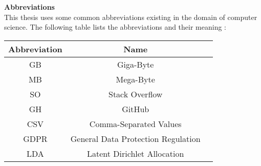 \begin{center}
{\Large\bf Abbreviations}\\
This thesis uses some common abbreviations existing in the domain of computer science. The following table lists the abbreviations and their meaning :\\ \vspace{12pt}
\begin{tabular}{ccc}
  \hline
  Abbreviation & Name  \\
  \hline\hline
  GB & Giga-Byte \\ 
  MB & Mega-Byte \\
  SO & Stack Overflow \\
  GH & GitHub \\
  CSV & Comma-Separated Values \\
  GDPR & General Data Protection Regulation \\
  LDA & Latent Dirichlet Allocation \\
  \hline
\end{tabular}
\end{center}
